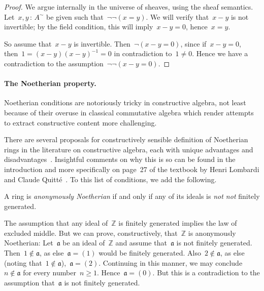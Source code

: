 \documentclass{ws-rv9x6}
\newcommand{\ZZ}{\mathbb{Z}}
\newcommand{\aaa}{\mathfrak{a}}
\renewcommand{\_}{\mathpunct{.}}
\newcommand{\?}{\,{:}\,}
\newcommand{\notnot}{\emph{not not}\xspace}
\begin{document}
\begin{proof}We argue internally in the universe of sheaves, using the sheaf
semantics. Let~$x,y \? A^\sim$ be given such
that~$\neg\neg(x = y)$. We will verify that~$x - y$ is not invertible; by the
field condition, this will imply~$x - y = 0$, hence~$x = y$.

So assume that~$x - y$ is invertible. Then~$\neg(x - y = 0)$, since if~$x - y =
0$, then~$1 = (x-y) (x-y)^{-1} = 0$ in contradiction to~$1 \neq 0$. Hence we have a
contradiction to the assumption~$\neg\neg(x-y=0)$.\end{proof}


\paragraph{The Noetherian property.}

Noetherian conditions are notoriously tricky in constructive algebra, not
least because of their overuse in classical commutative algebra which render
attempts to extract constructive content more challenging.

There are several proposals for constructively sensible definition of
Noetherian rings in the literature on constructive algebra, each with unique
advantages and
disadvantages~\cite{richman:noetherian,mines-richman-ruitenburg:constructive-algebra,perdry:noetherian,perdry:lazy,perdry-schuster:noetherian,tennenbaum:hilbert}.
Insightful comments on why this is so can be found in the introduction and more
specifically on page~27 of the textbook by Henri Lombardi and Claude
Quitté~\cite{lombardi-quitte:constructive-algebra}. To this list of conditions,
we add the following.

\begin{definition}
\label{defn:anonymously-noetherian}
A ring is \emph{anonymously Noetherian} if and only if any of its ideals is
\notnot finitely generated.
\end{definition}

\begin{example}\label{ex:z-noeth}The assumption that any ideal of~$\ZZ$ is finitely generated implies
the law of excluded middle. But we can prove, constructively, that~$\ZZ$ is
anonymously Noetherian: Let~$\aaa$ be an ideal of~$\ZZ$ and assume that~$\aaa$
is not finitely generated. Then~$1 \not\in \aaa$, as else~$\aaa = (1)$ would be
finitely generated. Also~$2 \not\in \aaa$, as else (noting
that~$1\not\in\aaa$),~$\aaa = (2)$. Continuing in this manner, we may
conclude~$n \not\in \aaa$ for every number~$n \geq 1$. Hence~$\aaa = (0)$. But
this is a contradiction to the assumption that~$\aaa$ is not finitely
generated.
\end{example}
\end{document}
